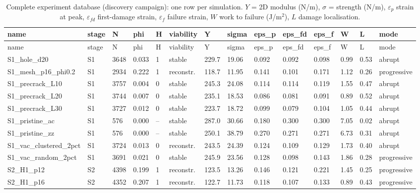 \begin{landscape}\footnotesize\setlength{\tabcolsep}{4pt}
\begin{longtable}{llllllllllllll}
\caption{Complete experiment database (discovery campaign): one row per simulation. $Y$ = 2D modulus (N/m), $\sigma$ = strength (N/m), $\varepsilon_p$ strain at peak, $\varepsilon_{fd}$ first-damage strain, $\varepsilon_f$ failure strain, $W$ work to failure (J/m$^2$), $L$ damage localisation.}\label{tab:database}\\
\toprule name & stage & N & phi & H & viability & Y & sigma & eps\_p & eps\_fd & eps\_f & W & L & mode\\ \midrule\endfirsthead
\toprule name & stage & N & phi & H & viability & Y & sigma & eps\_p & eps\_fd & eps\_f & W & L & mode\\ \midrule\endhead
S1\_hole\_d20 & S1 & 3648 & 0.033 & 1 & stable & 229.7 & 19.06 & 0.092 & 0.092 & 0.098 & 0.99 & 0.53 & abrupt\\
S1\_mesh\_p16\_phi0.2 & S1 & 2934 & 0.222 & 1 & reconstr. & 118.7 & 11.95 & 0.141 & 0.101 & 0.171 & 1.12 & 0.26 & progressive\\
S1\_precrack\_L10 & S1 & 3757 & 0.004 & 0 & stable & 245.3 & 24.08 & 0.114 & 0.114 & 0.119 & 1.55 & 0.47 & abrupt\\
S1\_precrack\_L20 & S1 & 3744 & 0.007 & 0 & stable & 235.1 & 18.53 & 0.086 & 0.081 & 0.091 & 0.89 & 0.52 & abrupt\\
S1\_precrack\_L30 & S1 & 3727 & 0.012 & 0 & stable & 223.7 & 18.72 & 0.099 & 0.079 & 0.104 & 1.05 & 0.44 & abrupt\\
S1\_pristine\_ac & S1 & 576 & 0.000 & -- & stable & 287.0 & 30.66 & 0.180 & 0.300 & 0.300 & 7.05 & 0.02 & abrupt\\
S1\_pristine\_zz & S1 & 576 & 0.000 & -- & stable & 250.1 & 38.79 & 0.270 & 0.271 & 0.271 & 6.73 & 0.31 & abrupt\\
S1\_vac\_clustered\_2pct & S1 & 3724 & 0.013 & 0 & reconstr. & 243.5 & 24.39 & 0.124 & 0.109 & 0.129 & 1.73 & 0.40 & abrupt\\
S1\_vac\_random\_2pct & S1 & 3691 & 0.021 & 0 & stable & 245.9 & 23.56 & 0.128 & 0.098 & 0.143 & 1.86 & 0.28 & progressive\\
S2\_H1\_p12 & S2 & 4398 & 0.199 & 1 & reconstr. & 123.5 & 13.26 & 0.146 & 0.121 & 0.221 & 1.45 & 0.25 & progressive\\
S2\_H1\_p16 & S2 & 4352 & 0.207 & 1 & reconstr. & 122.7 & 11.73 & 0.118 & 0.107 & 0.133 & 0.89 & 0.43 & progressive\\

\end{longtable}
\end{landscape}
